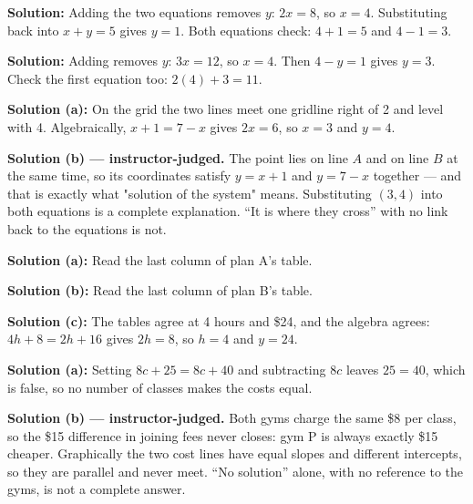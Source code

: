 \documentclass[12pt]{article}
\begin{document}




\textbf{Solution:} Adding the two equations removes $y$: $2x = 8$, so $x = 4$.
Substituting back into $x + y = 5$ gives $y = 1$. Both equations check:
$4 + 1 = 5$ and $4 - 1 = 3$. 


\textbf{Solution:} Adding removes $y$: $3x = 12$, so $x = 4$. Then
$4 - y = 1$ gives $y = 3$. Check the first equation too: $2(4) + 3 = 11$.


\textbf{Solution (a):} On the grid the two lines meet one gridline right of 2
and level with 4. Algebraically, $x + 1 = 7 - x$ gives $2x = 6$, so $x = 3$
and $y = 4$. 

\textbf{Solution (b) --- instructor-judged.} The point lies on line $A$ and on
line $B$ at the same time, so its coordinates satisfy $y = x + 1$ and
$y = 7 - x$ together --- and that is exactly what "solution of the system"
means. Substituting $(3, 4)$ into both equations is a complete explanation.
``It is where they cross'' with no link back to the equations is not.


\textbf{Solution (a):} Read the last column of plan A's table. 

\textbf{Solution (b):} Read the last column of plan B's table. 

\textbf{Solution (c):} The tables agree at 4 hours and \$24, and the algebra
agrees: $4h + 8 = 2h + 16$ gives $2h = 8$, so $h = 4$ and $y = 24$.


\textbf{Solution (a):} Setting $8c + 25 = 8c + 40$ and subtracting $8c$ leaves
$25 = 40$, which is false, so no number of classes makes the costs equal.

\textbf{Solution (b) --- instructor-judged.} Both gyms charge the same \$8 per
class, so the \$15 difference in joining fees never closes: gym P is always
exactly \$15 cheaper. Graphically the two cost lines have equal slopes and
different intercepts, so they are parallel and never meet. ``No solution''
alone, with no reference to the gyms, is not a complete answer.
\end{document}
